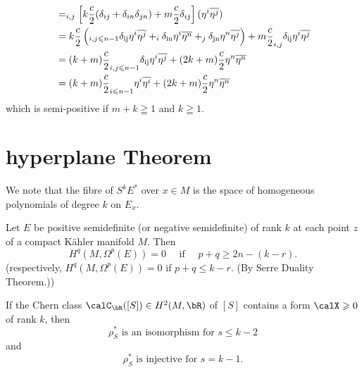 \documentclass[lang=en,12pt]{beautybook}
\begin{document}
\begin{align*}
                                   & =  \relax_{i, j}\left[ k \frac{c}{2}  (\delta_{ij} + \delta_{in} \delta_{jn}) + m
  \frac{c}{2} \delta_{ij} \right] (\eta^i \overline{\eta^j})                                                                                                                                         \\
                                   & =  k \frac{c}{2} \left( \relax_{i, j \leqslant n - 1} \delta_{\operatorname{ij}}
  \eta^i \overline{\eta^j} + \relax_i \delta_{\operatorname{in}} \eta^i
  \overline{\eta^n} + \relax_j \delta_{\operatorname{jn}} \eta^n \overline{\eta^j}
  \right) + m \frac{c}{2} \relax_{i, j} \delta_{\operatorname{ij}} \eta^i
  \overline{\eta^j}                                                                                                                                                                                  \\
                                   & =  (k + m) \frac{c}{2} \relax_{i, j \leqslant n - 1} \delta_{\operatorname{ij}}
  \eta^i \overline{\eta^j} + (2 k + m) \frac{c}{2} \eta^n \overline{\eta^n}                                                                                                                          \\
                                   & =  (k + m) \frac{c}{2} \relax_{i \leqslant n - 1} \eta^i \overline{\eta^i}
  + (2 k + m) \frac{c}{2} \eta^n \overline{\eta^n}
\end{align*}
which is semi-positive if $m + k \geqq 1$ and $k \geqq 1$.

\section*{hyperplane Theorem}
We note that the fibre of $S^k E^*$ over $x \in M$ is the space of homogeneous polynomials of degree $k$ on $E_x$.

\begin{theorem}
  Let $E$ be positive semidefinite (or negative semidefinite) of rank $k$ at each point $z$ of a compact K\"ahler manifold $M$. Then
  \begin{equation*}
    H^q\left(M, \Omega^p(E)\right)=0 \quad \text { if } \quad p+q \geqslant 2 n-(k-r).
  \end{equation*}
  (respectively, $H^q\left(M, \Omega^p(E)\right)=0$ if $p+q \leqslant k-r$. (By Serre Duality Theorem.))
\end{theorem}

\begin{theorem}
  If the Chern class $\calC_\bR ([S])\in H^2 (M,\bR)$ of $[S]$ contains a form $\calX\geqslant 0$ of rank $k$, then
  \[\rho^*_S\text{ is an isomorphism for $s\leqslant k-2$}\]
  and
  \[\rho^*_S\text{ is injective for $s=k-1$}.\]
\end{theorem}
\end{document}
